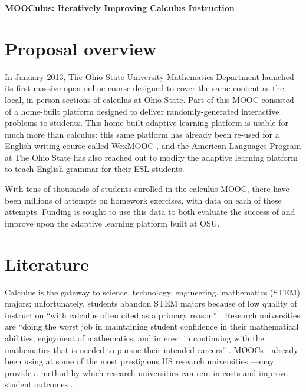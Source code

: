 \documentclass[12pt]{article}
\begin{document}
\begin{center}
  \textbf{MOOCulus: Iteratively Improving Calculus Instruction}
\end{center}

% 

\section{Proposal overview}

In January 2013, The Ohio State University Mathematics Department
launched its first massive open online course designed to cover the
same content as the local, in-person sections of calculus at Ohio
State.  Part of this MOOC consisted of a home-built platform designed
to deliver randomly-generated interactive problems to students.  This
home-built adaptive learning platform is usable for much more than
calculus: this same platform has already been re-used for a English
writing course called WexMOOC \parencite{gates-foundation-grant}, and
the American Languages Program at The Ohio State has also reached out
to modify the adaptive learning platform to teach English grammar for
their ESL students.

With tens of thousands of students enrolled in the calculus MOOC,
there have been millions of attempts on homework exercises, with data
on each of these attempts.  Funding is sought to use this data to both
evaluate the success of and improve upon the adaptive learning
platform built at OSU.

\section{Literature}

Calculus is the gateway to science, technology, engineering,
mathematics (STEM) majors; unfortunately, students abandon STEM majors
because of low quality of instruction ``with calculus often cited as a
primary reason'' \parencite{calculus-programs}.  Research universities
are ``doing the worst job in maintaining student confidence in their
mathematical abilities, enjoyment of mathematics, and interest in
continuing with the mathematics that is needed to pursue their
intended careers'' \parencite{calculus-students}.  MOOCs---already
been using at some of the most prestigious US research
universities \parencite{morris2013moocs}---may provide a method by
which research universities can rein in costs and improve student
outcomes \parencite{bowen2013higher}.
\end{document}
